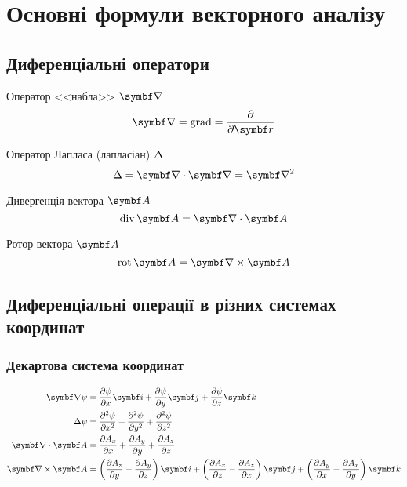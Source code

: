 
\section{Основні формули векторного аналізу}\label{Vanaliz}

\subsection{Диференціальні оператори}

Оператор <<набла>> $\vect{\nabla}$
\begin{equation}\label{nabla}
	\vect{\nabla} = \mathrm{grad} = \frac{\partial}{\partial \vect{r}}
\end{equation}

Оператор Лапласа (лапласіан) $\Delta$
\begin{equation}\label{laplasian}
	\Laplasian = \divg\vect{\nabla} = \vect{\nabla}^2
\end{equation}

Дивергенція вектора $\vect{A}$
\begin{equation}\label{div}
	\mathrm{div}\,\vect{A} = \divg\vect{A}
\end{equation}

Ротор вектора $\vect{A}$
\begin{equation}\label{rot}
	\mathrm{rot}\,\vect{A} = \rot\vect{A}
\end{equation}

\subsection{Диференціальні операції в різних системах координат}

\subsubsection{Декартова система координат}

\begin{align}\label{cartesian}
	\vect{\nabla}\psi & = \frac{\partial \psi}{\partial x} \vect{i} + \frac{\partial \psi}{\partial y} \vect{j} + \frac{\partial \psi}{\partial z} \vect{k} \\
	\Laplasian\psi    & = \frac{\partial^2 \psi}{\partial x^2} + \frac{\partial^2 \psi}{\partial y^2} + \frac{\partial^2 \psi }{\partial z^2}               \\
	\divg\vect{A}     & = \frac{\partial A_x}{\partial x}  + \frac{\partial A_y}{\partial y} + \frac{\partial A_z}{\partial z}                              \\
	\rot\vect{A}      & = \left( \frac{\partial A_z}{\partial y}  - \frac{\partial A_y}{\partial z}\right)  \vect{i} +
	\left( \frac{\partial A_x}{\partial z}  - \frac{\partial A_z}{\partial x}\right)  \vect{j} +
	\left( \frac{\partial A_y}{\partial x}  - \frac{\partial A_x}{\partial y}\right)  \vect{k}
\end{align}

